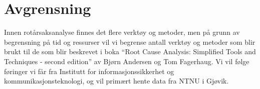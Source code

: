 \section{Avgrensning}
\label{sec:avgrensning}
Innen rotårsaksanalyse finnes det flere verktøy og metoder, men på grunn av begrensning på tid og ressurser vil vi begrense antall verktøy og metoder som blir brukt til de som blir beskrevet i boka “Root Cause Analysis: Simplified Tools and Techniques - second edition” av Bjørn Andersen og Tom Fagerhaug. Vi vil følge føringer vi får fra Institutt for informasjonssikkerhet og kommunikasjonsteknologi, og vil primært hente data fra NTNU i Gjøvik. 